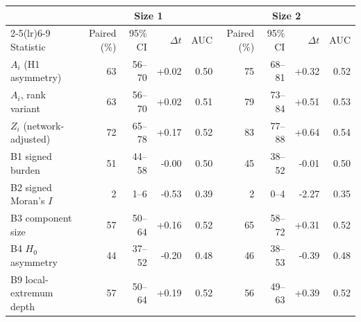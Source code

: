 \begin{tabular}{lrrrrrrrr}
\toprule
 & \multicolumn{4}{c}{Size 1} & \multicolumn{4}{c}{Size 2} \\
\cmidrule(lr){2-5}\cmidrule(lr){6-9}
Statistic & Paired (\%) & 95\% CI & $\Delta t$ & AUC & Paired (\%) & 95\% CI & $\Delta t$ & AUC \\
\midrule
$A_i$ (H1 asymmetry) & 63 & 56--70 & +0.02 & 0.50 & 75 & 68--81 & +0.32 & 0.52 \\
$A_i$, rank variant & 63 & 56--70 & +0.02 & 0.51 & 79 & 73--84 & +0.51 & 0.53 \\
$Z_i$ (network-adjusted) & 72 & 65--78 & +0.17 & 0.52 & 83 & 77--88 & +0.64 & 0.54 \\
B1 signed burden & 51 & 44--58 & -0.00 & 0.50 & 45 & 38--52 & -0.01 & 0.50 \\
B2 signed Moran's $I$ & 2 & 1--6 & -0.53 & 0.39 & 2 & 0--4 & -2.27 & 0.35 \\
B3 component size & 57 & 50--64 & +0.16 & 0.52 & 65 & 58--72 & +0.31 & 0.52 \\
B4 $H_0$ asymmetry & 44 & 37--52 & -0.20 & 0.48 & 46 & 38--53 & -0.39 & 0.48 \\
B9 local-extremum depth & 57 & 50--64 & +0.19 & 0.52 & 56 & 49--63 & +0.39 & 0.52 \\
\bottomrule
\end{tabular}
